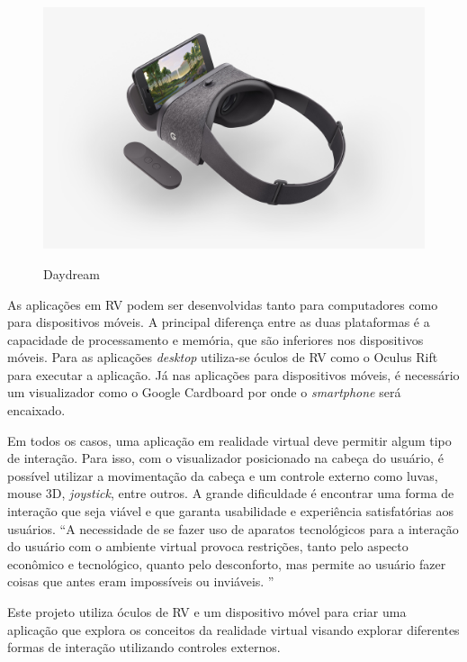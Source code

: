 \begin{figure}[ht]
	\caption{\small Daydream}
	\centering
	\includegraphics[scale=0.15]{Imagens/daydream.jpg}
	\label{f.daydream}
\end{figure}

As aplicações em RV podem ser desenvolvidas tanto para computadores como para dispositivos móveis. A principal diferença entre as duas plataformas é a capacidade de processamento e memória, que são inferiores nos dispositivos móveis. Para as aplicações \textit{desktop} utiliza-se óculos de RV como o Oculus Rift para executar a aplicação. Já nas aplicações para dispositivos móveis, é necessário um visualizador como o Google Cardboard por onde o \textit{smartphone} será encaixado.

Em todos os casos, uma aplicação em realidade virtual deve permitir algum tipo de interação. Para isso, com o visualizador posicionado na cabeça do usuário, é possível utilizar a movimentação da cabeça e um controle externo como luvas, mouse 3D, \textit{joystick}, entre outros. A grande dificuldade é encontrar uma forma de interação que seja viável e que garanta usabilidade e experiência satisfatórias aos usuários. “A necessidade de se fazer uso de aparatos tecnológicos para a interação do usuário com o ambiente virtual provoca restrições, tanto pelo aspecto econômico e tecnológico, quanto pelo desconforto, mas permite ao usuário fazer coisas que antes eram impossíveis ou inviáveis. ” \cite[p. ~3]{torilivro}

Este projeto utiliza óculos de RV e um dispositivo móvel para criar uma aplicação que explora os conceitos da realidade virtual visando explorar diferentes formas de interação utilizando controles externos.

